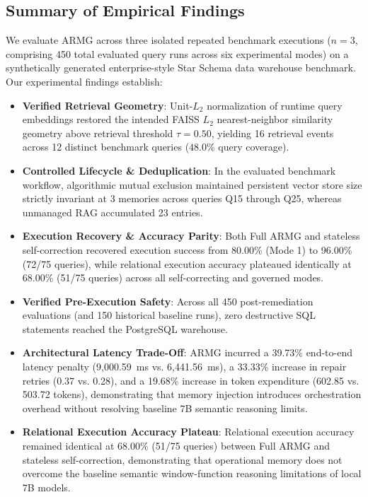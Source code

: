 \documentclass[conference]{IEEEtran}
\begin{document}
\subsection{Summary of Empirical Findings}
We evaluate ARMG across three isolated repeated benchmark executions ($n = 3$, comprising 450 total evaluated query runs across six experimental modes) on a synthetically generated enterprise-style Star Schema data warehouse benchmark. Our experimental findings establish:
\begin{itemize}
    \item \textbf{Verified Retrieval Geometry}: Unit-$L_2$ normalization of runtime query embeddings restored the intended FAISS $L_2$ nearest-neighbor similarity geometry above retrieval threshold $\tau = 0.50$, yielding 16 retrieval events across 12 distinct benchmark queries ($48.0\%$ query coverage).
    \item \textbf{Controlled Lifecycle \& Deduplication}: In the evaluated benchmark workflow, algorithmic mutual exclusion maintained persistent vector store size strictly invariant at 3 memories across queries Q15 through Q25, whereas unmanaged RAG accumulated 23 entries.
    \item \textbf{Execution Recovery \& Accuracy Parity}: Both Full ARMG and stateless self-correction recovered execution success from 80.00\% (Mode 1) to 96.00\% (72/75 queries), while relational execution accuracy plateaued identically at 68.00\% (51/75 queries) across all self-correcting and governed modes.
    \item \textbf{Verified Pre-Execution Safety}: Across all 450 post-remediation evaluations (and 150 historical baseline runs), zero destructive SQL statements reached the PostgreSQL warehouse.
    \item \textbf{Architectural Latency Trade-Off}: ARMG incurred a 39.73\% end-to-end latency penalty (9,000.59~ms vs. 6,441.56~ms), a 33.33\% increase in repair retries (0.37 vs. 0.28), and a 19.68\% increase in token expenditure (602.85 vs. 503.72 tokens), demonstrating that memory injection introduces orchestration overhead without resolving baseline 7B semantic reasoning limits.
    \item \textbf{Relational Execution Accuracy Plateau}: Relational execution accuracy remained identical at 68.00\% (51/75 queries) between Full ARMG and stateless self-correction, demonstrating that operational memory does not overcome the baseline semantic window-function reasoning limitations of local 7B models.
\end{itemize}
\end{document}
